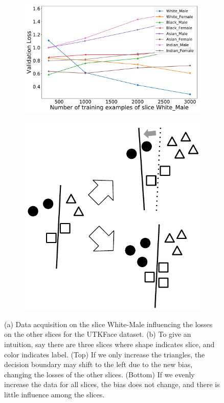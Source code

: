 \documentclass[11pt]{article}
\begin{document}
\begin{figure}[h]
\begin{subfigure}
\centering
\includegraphics[scale=0.23]{submissions/responsible-ai/figs/loss_numexamples_utk.pdf}
\end{subfigure}
\hspace{2cm}
\begin{subfigure}
\centering
\includegraphics[scale=0.54]{submissions/responsible-ai/figs/influence.pdf}
\end{subfigure}
  \caption{(a) Data acquisition on the slice White-Male influencing the losses on the other slices for the UTKFace dataset. (b) To give an intuition, say there are three slices where shape indicates slice, and color indicates label. (Top) If we only increase the triangles, the decision boundary may shift to the left due to the new bias, changing the losses of the other slices. (Bottom) If we evenly increase the data for all slices, the bias does not change, and there is little influence among the slices.}
  \label{fig:influence}
\end{figure}
\end{document}
